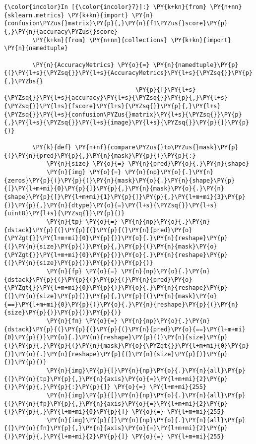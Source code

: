     \begin{Verbatim}[commandchars=\\\{\}]
{\color{incolor}In [{\color{incolor}7}]:} \PY{k+kn}{from} \PY{n+nn}{sklearn.metrics} \PY{k+kn}{import} \PY{n}{confusion\PYZus{}matrix}\PY{p}{,}\PY{n}{f1\PYZus{}score}\PY{p}{,}\PY{n}{accuracy\PYZus{}score}
        \PY{k+kn}{from} \PY{n+nn}{collections} \PY{k+kn}{import} \PY{n}{namedtuple}
        
        \PY{n}{AccuracyMetrics} \PY{o}{=} \PY{n}{namedtuple}\PY{p}{(}\PY{l+s}{\PYZsq{}}\PY{l+s}{AccuracyMetrics}\PY{l+s}{\PYZsq{}}\PY{p}{,}\PYZbs{}
                                     \PY{p}{[}\PY{l+s}{\PYZsq{}}\PY{l+s}{accuracy}\PY{l+s}{\PYZsq{}}\PY{p}{,}\PY{l+s}{\PYZsq{}}\PY{l+s}{fscore}\PY{l+s}{\PYZsq{}}\PY{p}{,}\PY{l+s}{\PYZsq{}}\PY{l+s}{confusion\PYZus{}matrix}\PY{l+s}{\PYZsq{}}\PY{p}{,}\PY{l+s}{\PYZsq{}}\PY{l+s}{image}\PY{l+s}{\PYZsq{}}\PY{p}{]}\PY{p}{)}
        
        \PY{k}{def} \PY{n+nf}{compare\PYZus{}to\PYZus{}mask}\PY{p}{(}\PY{n}{pred}\PY{p}{,}\PY{n}{mask}\PY{p}{)}\PY{p}{:}
            \PY{n}{size} \PY{o}{=} \PY{n}{pred}\PY{o}{.}\PY{n}{shape}
            \PY{n}{img} \PY{o}{=} \PY{n}{np}\PY{o}{.}\PY{n}{zeros}\PY{p}{(}\PY{p}{(}\PY{n}{mask}\PY{o}{.}\PY{n}{shape}\PY{p}{[}\PY{l+m+mi}{0}\PY{p}{]}\PY{p}{,}\PY{n}{mask}\PY{o}{.}\PY{n}{shape}\PY{p}{[}\PY{l+m+mi}{1}\PY{p}{]}\PY{p}{,}\PY{l+m+mi}{3}\PY{p}{)}\PY{p}{,}\PY{n}{dtype}\PY{o}{=}\PY{l+s}{\PYZsq{}}\PY{l+s}{uint8}\PY{l+s}{\PYZsq{}}\PY{p}{)}
            \PY{n}{tp} \PY{o}{=} \PY{n}{np}\PY{o}{.}\PY{n}{dstack}\PY{p}{(}\PY{p}{(}\PY{p}{(}\PY{n}{pred}\PY{o}{\PYZgt{}}\PY{l+m+mi}{0}\PY{p}{)}\PY{o}{.}\PY{n}{reshape}\PY{p}{(}\PY{n}{size}\PY{p}{)}\PY{p}{,}\PY{p}{(}\PY{n}{mask}\PY{o}{\PYZgt{}}\PY{l+m+mi}{0}\PY{p}{)}\PY{o}{.}\PY{n}{reshape}\PY{p}{(}\PY{n}{size}\PY{p}{)}\PY{p}{)}\PY{p}{)}
            \PY{n}{fp} \PY{o}{=} \PY{n}{np}\PY{o}{.}\PY{n}{dstack}\PY{p}{(}\PY{p}{(}\PY{p}{(}\PY{n}{pred}\PY{o}{\PYZgt{}}\PY{l+m+mi}{0}\PY{p}{)}\PY{o}{.}\PY{n}{reshape}\PY{p}{(}\PY{n}{size}\PY{p}{)}\PY{p}{,}\PY{p}{(}\PY{n}{mask}\PY{o}{==}\PY{l+m+mi}{0}\PY{p}{)}\PY{o}{.}\PY{n}{reshape}\PY{p}{(}\PY{n}{size}\PY{p}{)}\PY{p}{)}\PY{p}{)}
            \PY{n}{fn} \PY{o}{=} \PY{n}{np}\PY{o}{.}\PY{n}{dstack}\PY{p}{(}\PY{p}{(}\PY{p}{(}\PY{n}{pred}\PY{o}{==}\PY{l+m+mi}{0}\PY{p}{)}\PY{o}{.}\PY{n}{reshape}\PY{p}{(}\PY{n}{size}\PY{p}{)}\PY{p}{,}\PY{p}{(}\PY{n}{mask}\PY{o}{\PYZgt{}}\PY{l+m+mi}{0}\PY{p}{)}\PY{o}{.}\PY{n}{reshape}\PY{p}{(}\PY{n}{size}\PY{p}{)}\PY{p}{)}\PY{p}{)}
            \PY{n}{img}\PY{p}{[}\PY{n}{np}\PY{o}{.}\PY{n}{all}\PY{p}{(}\PY{n}{tp}\PY{p}{,}\PY{n}{axis}\PY{o}{=}\PY{l+m+mi}{2}\PY{p}{)}\PY{p}{,}\PY{p}{:}\PY{p}{]} \PY{o}{=} \PY{l+m+mi}{255}
            \PY{n}{img}\PY{p}{[}\PY{n}{np}\PY{o}{.}\PY{n}{all}\PY{p}{(}\PY{n}{fp}\PY{p}{,}\PY{n}{axis}\PY{o}{=}\PY{l+m+mi}{2}\PY{p}{)}\PY{p}{,}\PY{l+m+mi}{0}\PY{p}{]} \PY{o}{=} \PY{l+m+mi}{255}
            \PY{n}{img}\PY{p}{[}\PY{n}{np}\PY{o}{.}\PY{n}{all}\PY{p}{(}\PY{n}{fn}\PY{p}{,}\PY{n}{axis}\PY{o}{=}\PY{l+m+mi}{2}\PY{p}{)}\PY{p}{,}\PY{l+m+mi}{2}\PY{p}{]} \PY{o}{=} \PY{l+m+mi}{255}
            

\end{Verbatim}

